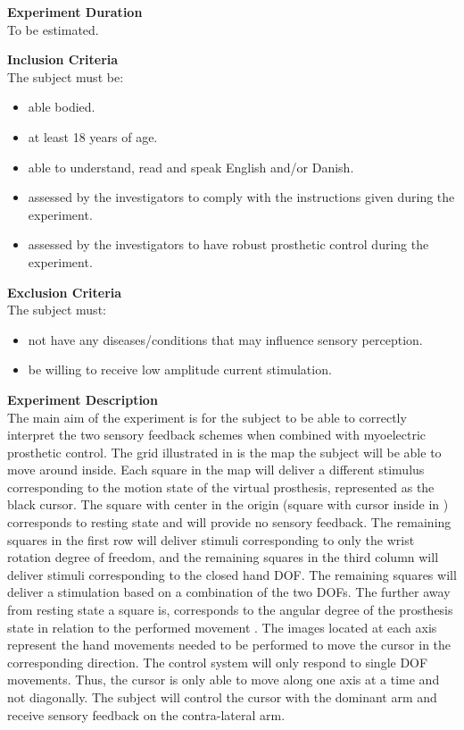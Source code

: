 \textbf{Experiment Duration} \\
To be estimated.

\textbf{Inclusion Criteria} \\
The subject must be:
\begin{itemize}
	\item able bodied. %
	\item at least 18 years of age.
	\item able to understand, read and speak English and/or Danish.
	\item assessed by the investigators to comply with the instructions given during the experiment.
	\item assessed by the investigators to have robust prosthetic control during the experiment.
\end{itemize}

\textbf{Exclusion Criteria} \\
The subject must:
\begin{itemize}
	\item not have any diseases/conditions that may influence sensory perception.
	\item be willing to receive low amplitude current stimulation. 
\end{itemize}

\textbf{{\Large Experiment Description}} \\
\newline
The main aim of the experiment is for the subject to be able to correctly interpret the two sensory feedback schemes when combined with myoelectric prosthetic control. The grid illustrated in  is the map the subject will be able to move around inside. Each square in the map will deliver a different stimulus corresponding to the motion state of the virtual prosthesis, represented as the black cursor. The square with center in the origin (square with cursor inside in ) corresponds to resting state and will provide no sensory feedback. The remaining squares in the first row will deliver stimuli corresponding to only the wrist rotation degree of freedom, and the remaining squares in the third column will deliver stimuli corresponding to the closed hand DOF. The remaining squares will deliver a stimulation based on a combination of the two DOFs. The further away from resting state a square is, corresponds to the angular degree of the prosthesis state in relation to the performed movement .
The images located at each axis represent the hand movements needed to be performed to move the cursor in the corresponding direction. The control system will only respond to single DOF movements. Thus, the cursor is only able to move along one axis at a time and not diagonally. The subject will control the cursor with the dominant arm and receive sensory feedback on the contra-lateral arm. 

